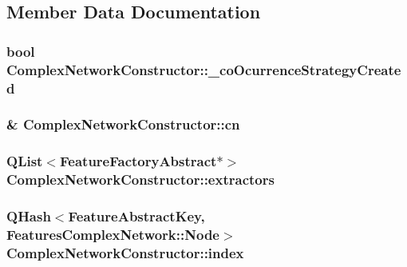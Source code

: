 \subsection{Member Data Documentation}
\hypertarget{class_complex_network_constructor_a56a1a391bdbd14e4f9a9c19125205bf9}{
\subsubsection[{\+\_\+co\+Ocurrence\+Strategy\+Created}]{\setlength{\rightskip}{0pt plus 5cm}bool Complex\+Network\+Constructor\+::\+\_\+co\+Ocurrence\+Strategy\+Created\hspace{0.3cm}{\ttfamily [private]}}}\label{class_complex_network_constructor_a56a1a391bdbd14e4f9a9c19125205bf9}
\hypertarget{class_complex_network_constructor_aa099456a58edc5c1885323061206b3e6}{
\subsubsection[{cn}]{\& Complex\+Network\+Constructor\+::cn\hspace{0.3cm}{\ttfamily [private]}}}\label{class_complex_network_constructor_aa099456a58edc5c1885323061206b3e6}
\hypertarget{class_complex_network_constructor_ae79b538a8b9253cd71de5fef1be1c18a}{
\subsubsection[{extractors}]{\setlength{\rightskip}{0pt plus 5cm}Q\+List$<${\bf Feature\+Factory\+Abstract}$\ast$$>$ Complex\+Network\+Constructor\+::extractors\hspace{0.3cm}{\ttfamily [private]}}}\label{class_complex_network_constructor_ae79b538a8b9253cd71de5fef1be1c18a}
\hypertarget{class_complex_network_constructor_a1eb20c95af12f063ecbc3052eb03a00a}{
\subsubsection[{index}]{\setlength{\rightskip}{0pt plus 5cm}Q\+Hash$<${\bf Feature\+Abstract\+Key}, Features\+Complex\+Network\+::\+Node$>$ Complex\+Network\+Constructor\+::index\hspace{0.3cm}{\ttfamily [private]}}}\label{class_complex_network_constructor_a1eb20c95af12f063ecbc3052eb03a00a}
